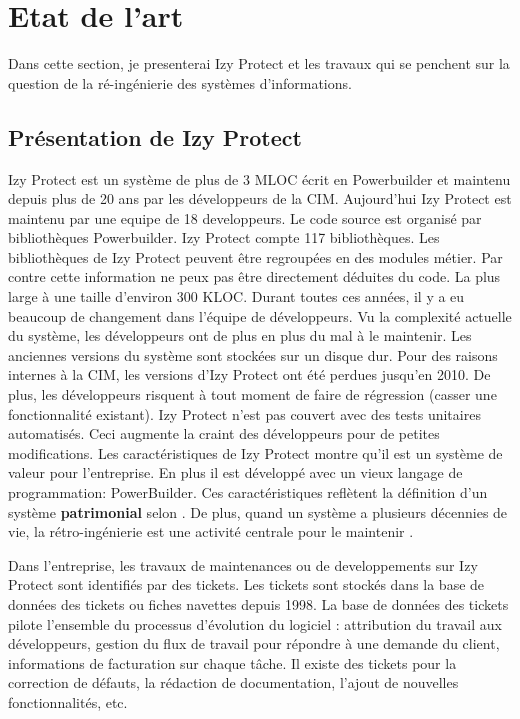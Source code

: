 \documentclass[a4paper]{article}
\begin{document}
\section{Etat de l'art}
\label{sec:stateOfTheArt}
Dans cette section, je presenterai Izy Protect et les travaux qui se penchent sur la question de la ré-ingénierie des systèmes d'informations.
\subsection{Présentation de Izy Protect}
\label{sec:izyProtect}
Izy Protect est un système de plus de 3 MLOC écrit en Powerbuilder et maintenu depuis plus de 20 ans par les développeurs de la CIM. 
Aujourd'hui Izy Protect est maintenu par une equipe de 18 developpeurs.
 Le code source est organisé par bibliothèques Powerbuilder. 
Izy Protect compte 117 bibliothèques. Les bibliothèques de Izy Protect peuvent être regroupées en des modules métier.
 Par contre cette information ne peux pas être directement déduites du code.
 La plus large à une taille d'environ 300 KLOC.
Durant toutes ces années, il y a eu beaucoup de changement dans l'équipe de développeurs. 
Vu la complexité actuelle du système, les développeurs ont de plus en plus du mal à le maintenir.
Les anciennes versions du système sont stockées sur un disque dur.
 Pour des raisons internes à la CIM, les versions d'Izy Protect ont été perdues jusqu'en 2010. 
 De plus, les développeurs risquent à tout moment de faire de régression (casser une fonctionnalité existant). 
Izy Protect  n'est pas couvert avec des tests unitaires automatisés.
Ceci augmente la craint des développeurs pour de petites modifications. 
Les caractéristiques de Izy Protect montre qu'il est un système de valeur pour l'entreprise. En plus il est développé avec un vieux langage de programmation: PowerBuilder.
Ces caractéristiques reflètent la définition d'un système \textbf{patrimonial} selon \citet{Deme02a}.
De plus, quand un système a plusieurs décennies de vie, la rétro-ingénierie est une activité centrale pour le maintenir \cite{Deme02a}.

Dans l'entreprise, les travaux de maintenances ou de developpements sur Izy Protect sont identifiés par des tickets.
Les tickets sont stockés dans la base de données des tickets ou fiches navettes depuis 1998. 
La base de données des tickets pilote l'ensemble du processus d'évolution du logiciel : attribution du travail aux développeurs, gestion du flux de travail pour répondre à une demande du client, informations de facturation sur chaque tâche.
Il existe des tickets pour la correction de défauts, la rédaction de documentation, l'ajout de nouvelles fonctionnalités, etc. 
\end{document}
